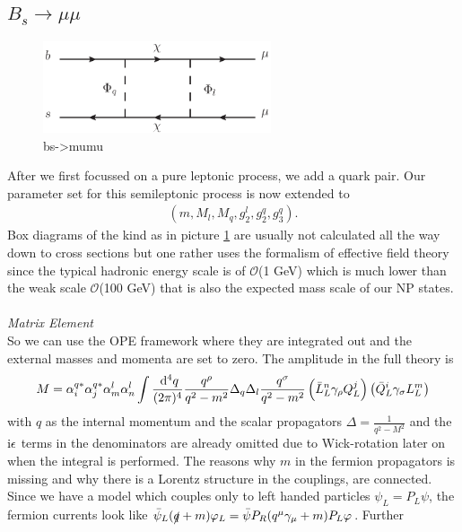 \subsection{$B_s\rightarrow \mu\mu$}
\begin{figure}[t]
 \includegraphics[width=0.6\textwidth]{../pics/bsmumu.eps}
 \caption{bs->mumu}
 \label{pic_Bsmumu}
\end{figure}
After we first focussed on a pure leptonic process, we add a quark pair. Our parameter set for this semileptonic process is now extended to
\begin{align}
 \left(m, M_l, M_q, g_2^l, g_2^q, g_3^q\right).
\end{align}
Box diagrams of the kind as in picture \ref{pic_Bsmumu} are usually not calculated 
all the way down to cross sections but one rather uses the formalism of effective field theory since the typical hadronic energy scale is of
$\mathcal{O}$(1 GeV) which is much lower than the weak scale $\mathcal{O}$(100 GeV) that is also the expected mass scale of our NP states. 
\\ \\ \noindent \textit{Matrix Element}\\
\noindent So we can use 
the OPE framework where they are integrated out and the external masses and momenta are set to zero. The amplitude in the full theory is
\begin{align}
 M =\alpha_i^{q*} \alpha_j^{q*} \alpha_m^l \alpha_n^l\int \frac{\; \mathrm{d}^4 q}{(2\pi)^4} \frac{q^\rho}{q^2-m^2}\Delta_q \Delta_l \frac{q^\sigma}{q^2-m^2} \left(\bar L_L^n \gamma_\rho Q_L^j\right) \left(\bar Q_L^i \gamma_\sigma L_L^m\right)
 \label{eq_matElemBSmumu}
\end{align}
with $q$ as the internal momentum and the scalar propagators $\Delta = \frac{1}{q^2-M^2}$ and the $\text{i}\epsilon$ terms in the denominators are already omitted
due to Wick-rotation later on when the integral is performed. The reasons why $m$ in the fermion propagators is missing
and why there is a Lorentz structure in the couplings, are connected. Since we have a model which couples only to left handed particles $\psi_L = P_L \psi$,
the fermion currents look like $\bar \psi_L (\slashed{q}+m)\varphi_L = \bar \psi P_R (q^\mu \gamma_\mu+m) P_L\varphi$. Further
